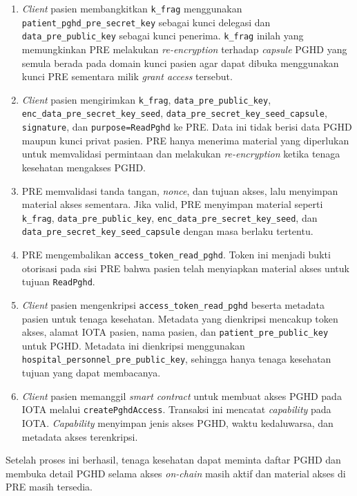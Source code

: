 \begin{enumerate}
    \item \textit{Client} pasien membangkitkan \texttt{k\_frag} menggunakan \texttt{patient\_pghd\_pre\_secret\_key} sebagai kunci delegasi dan \texttt{data\_pre\_public\_key} sebagai kunci penerima.
    \texttt{k\_frag} inilah yang memungkinkan PRE melakukan \textit{re-encryption} terhadap \textit{capsule} PGHD yang semula berada pada domain kunci pasien agar dapat dibuka menggunakan kunci PRE sementara milik \textit{grant access} tersebut.

    \item \textit{Client} pasien mengirimkan \texttt{k\_frag}, \texttt{data\_pre\_public\_key}, \texttt{enc\_\allowbreak{}data\_\allowbreak{}pre\_\allowbreak{}secret\_\allowbreak{}key\_\allowbreak{}seed}, \texttt{data\_\allowbreak{}pre\_\allowbreak{}secret\_\allowbreak{}key\_\allowbreak{}seed\_\allowbreak{}capsule}, \texttt{signature}, dan \texttt{purpose=ReadPghd} ke PRE\@.
    Data ini tidak berisi data PGHD maupun kunci privat pasien. 
    PRE hanya menerima material yang diperlukan untuk memvalidasi permintaan dan melakukan \textit{re-encryption} ketika tenaga kesehatan mengakses PGHD\@.

    \item PRE memvalidasi tanda tangan, \textit{nonce}, dan tujuan akses, lalu menyimpan material akses sementara.
    Jika valid, PRE menyimpan material seperti \texttt{k\_frag}, \texttt{data\_pre\_public\_key}, \texttt{enc\_\allowbreak{}data\_\allowbreak{}pre\_\allowbreak{}secret\_\allowbreak{}key\_\allowbreak{}seed}, dan \texttt{data\_\allowbreak{}pre\_\allowbreak{}secret\_\allowbreak{}key\_\allowbreak{}seed\_\allowbreak{}capsule} dengan masa berlaku tertentu\@.

    \item PRE mengembalikan \texttt{access\_token\_read\_pghd}.
    Token ini menjadi bukti otorisasi pada sisi PRE bahwa pasien telah menyiapkan material akses untuk tujuan \texttt{ReadPghd}.

    \item \textit{Client} pasien mengenkripsi \texttt{access\_token\_read\_pghd} beserta metadata pasien untuk tenaga kesehatan.
    Metadata yang dienkripsi mencakup token akses, alamat IOTA pasien, nama pasien, dan \texttt{patient\_pre\_public\_key} untuk PGHD\@.
    Metadata ini dienkripsi menggunakan \texttt{hospital\_personnel\_pre\_public\_key}, sehingga hanya tenaga kesehatan tujuan yang dapat membacanya.

    \item \textit{Client} pasien memanggil \textit{smart contract} untuk membuat akses PGHD pada IOTA melalui \texttt{createPghdAccess}.
    Transaksi ini mencatat \textit{capability} pada IOTA\@. 
    \textit{Capability} menyimpan jenis akses PGHD, waktu kedaluwarsa, dan metadata akses terenkripsi.
\end{enumerate}

Setelah proses ini berhasil, tenaga kesehatan dapat meminta daftar PGHD dan membuka detail PGHD selama akses \textit{on-chain} masih aktif dan material akses di PRE masih tersedia.

